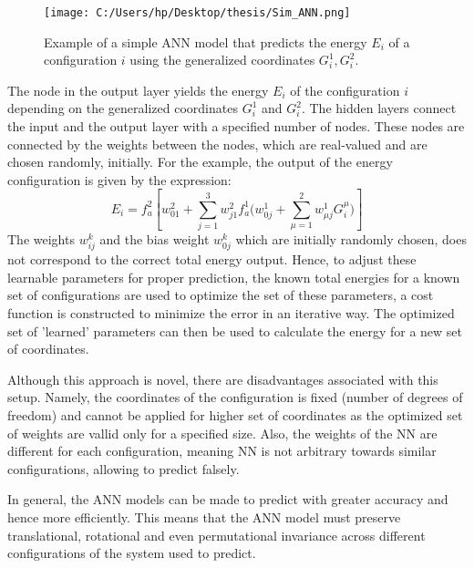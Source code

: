 \documentclass[11pt,a4paper]{report}
\begin{document}
{\begin{figure} [H]
\centering
\texttt{[image: C:/Users/hp/Desktop/thesis/Sim\_ANN.png]}
\caption{Example of a simple ANN model that predicts the energy $E_i$ of a configuration $i$ using the generalized coordinates $G^1_i, G^2_i$. }
\end{figure}

The node in the output layer yields the energy $E_i$ of the configuration $i$ depending on the generalized coordinates $G^1_i$ and $G^2_i$. The hidden layers connect the input and the output layer with a specified number of nodes. These nodes are connected by the weights between the nodes, which are real-valued and are chosen randomly, initially. For the example, the output of the energy configuration is given by the expression:
\begin{equation} 
E_i=f^2_a[w_{01}^2+\sum_{j=1}^{3}{w^2_{j1}f^1_a(w^1_{0j}+\sum_{\mu=1}^{2}{w^1_{\mu j}G^{\mu}_i)}}]
\end{equation}
The weights $w^k_{ij}$ and the bias weight $w^k_{0j}$ which are initially randomly chosen, does not correspond to the correct total energy output. Hence, to adjust these learnable parameters for proper prediction, the known total energies for a known set of configurations are used to optimize the set of these parameters, a cost function is constructed to minimize the error in an iterative way. The optimized set of 'learned' parameters can then be used to calculate the energy for a new set of coordinates.

Although this approach is novel\cite{simANN}, there are disadvantages associated with this setup. Namely, the coordinates of the configuration is fixed (number of degrees of freedom) and cannot be applied for higher set of coordinates as the optimized set of weights are vallid only for a specified size. Also, the weights of the NN are different for each configuration, meaning NN is not arbitrary towards similar configurations, allowing to predict falsely. 

In general, the ANN models can be made to predict with greater accuracy and hence more efficiently. This means that the ANN model must preserve translational, rotational and even permutational invariance across different configurations of the system used to predict.

}
\end{document}
